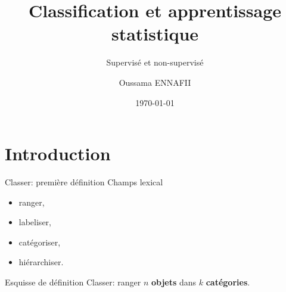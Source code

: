 \documentclass[8pt]{beamer}
\title{Classification et apprentissage statistique}
\subtitle{Supervisé et non-supervisé}
\author{Oussama ENNAFII}
\institute{ENSG}
\date{\today}
\begin{document}
	\begin{frame}[plain]
		\titlepage{}
	\end{frame}

	\section{Introduction}

		\begin{frame}{Classer: première définition}
			Champs lexical
			\begin{itemize}
				\item<2-> ranger,
				\item<3-> labeliser,
				\item<4-> catégoriser,
				\item<5-> hiérarchiser.
			\end{itemize}
			\begin{block}{Esquisse de définition}
				Classer: ranger $n$ \textbf{objets} dans $k$ \textbf{catégories}.
			\end{block}
		\end{frame}

\end{document}
